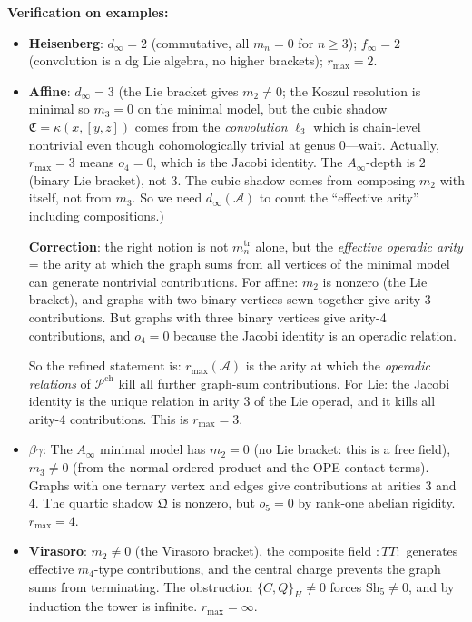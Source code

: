 \documentclass[11pt]{article}
\theoremstyle{definition}
\theoremstyle{remark}
\newcommand{\Pch}{\mathcal{P}^{\mathrm{ch}}}
\newcommand{\Sh}{\mathrm{Sh}}
\newcommand{\cA}{\mathcal{A}}
\begin{document}
\textbf{Verification on examples:}
\begin{itemize}
\item \textbf{Heisenberg}: $d_\infty = 2$ (commutative, all
$m_n = 0$ for $n \geq 3$); $f_\infty = 2$ (convolution is a dg Lie
algebra, no higher brackets); $r_{\max} = 2$.
\checkmark

\item \textbf{Affine}: $d_\infty = 3$ (the Lie bracket gives
$m_2 \neq 0$; the Koszul resolution is minimal so $m_3 = 0$ on
the minimal model, but the cubic shadow
$\mathfrak{C} = \kappa(x,[y,z])$ comes from the \emph{convolution}
$\ell_3$ which is chain-level nontrivial even though
cohomologically trivial at genus 0---wait.  Actually,
$r_{\max} = 3$ means $o_4 = 0$, which is the Jacobi identity.
The $A_\infty$-depth is $2$ (binary Lie bracket), not $3$.
The cubic shadow comes from composing $m_2$ with itself, not from
$m_3$.  So we need $d_\infty(\cA)$ to count the ``effective arity''
including compositions.)

\textbf{Correction}: the right notion is not $m_n^{\mathrm{tr}}$
alone, but the \emph{effective operadic arity} = the arity at
which the graph sums from all vertices of the minimal model
can generate nontrivial contributions.  For affine: $m_2$ is
nonzero (the Lie bracket), and graphs with two binary vertices
sewn together give arity-3 contributions.  But graphs with
three binary vertices give arity-4 contributions, and $o_4 = 0$
because the Jacobi identity is an operadic relation.

So the refined statement is: $r_{\max}(\cA)$ is the arity at
which the \emph{operadic relations} of $\Pch$ kill all further
graph-sum contributions.  For $\mathrm{Lie}$: the Jacobi identity
is the unique relation in arity 3 of the Lie operad, and it kills
all arity-4 contributions.  This is $r_{\max} = 3$.

\item \textbf{$\beta\gamma$}: The $A_\infty$ minimal model has
$m_2 = 0$ (no Lie bracket: this is a free field), $m_3 \neq 0$
(from the normal-ordered product and the OPE contact terms).
Graphs with one ternary vertex and edges give contributions at
arities 3 and 4.  The quartic shadow $\mathfrak{Q}$ is nonzero,
but $o_5 = 0$ by rank-one abelian rigidity.
$r_{\max} = 4$.

\item \textbf{Virasoro}: $m_2 \neq 0$ (the Virasoro bracket),
the composite field $:TT:$ generates effective $m_4$-type
contributions, and the central charge prevents the graph sums from
terminating.  The obstruction
$\{C, Q\}_H \neq 0$ forces $\Sh_5 \neq 0$, and by
induction the tower is infinite.  $r_{\max} = \infty$.
\end{itemize}
\end{document}
